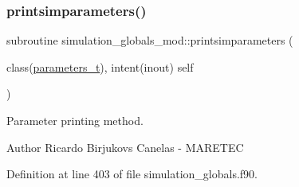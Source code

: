 \subsubsection{\texorpdfstring{printsimparameters()}{printsimparameters()}}
{\footnotesize\ttfamily subroutine simulation\+\_\+globals\+\_\+mod\+::printsimparameters (\begin{DoxyParamCaption}\item[{class(\mbox{\hyperlink{structsimulation__globals__mod_1_1parameters__t}{parameters\+\_\+t}}), intent(inout)}]{self }\end{DoxyParamCaption})\hspace{0.3cm}{\ttfamily [private]}}



Parameter printing method. 

\begin{DoxyAuthor}{Author}
Ricardo Birjukovs Canelas -\/ M\+A\+R\+E\+T\+EC 
\end{DoxyAuthor}


Definition at line 403 of file simulation\+\_\+globals.\+f90.


